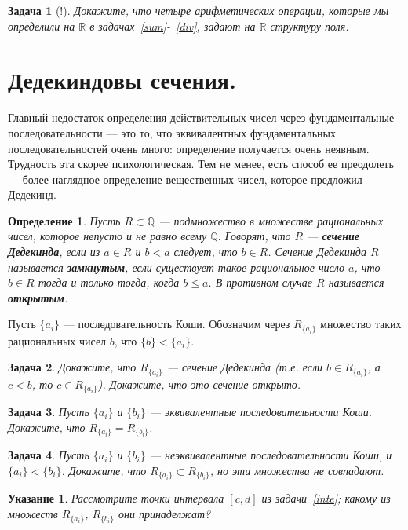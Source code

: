 \documentclass[12pt]{book}
\newcommand{\subs}{\section}
\def\R{{\mathbb R}}
\def\Q{{\mathbb Q}}
\theoremstyle{upshape}
\newtheorem{zadacha}{Задача}[chapter]
\theoremstyle{generic}
\newtheorem{opredelenie}[teorema]{Определение}
\theoremstyle{upshapenonumber}
\newtheorem{ukazanie}{Указание}[section]
\newcommand{\следствие}{%
     \refstepcounter{teorema}
     {\noindent\bf Следствие \thechapter.\arabic{teorema}:\ }}
\newcommand{\пример}{%
     \refstepcounter{teorema}
     {\noindent\bf Пример \thechapter.\arabic{teorema}:\ }}
\newcommand{\лемма}{%
     \refstepcounter{teorema}
     {\noindent\bf Лемма \thechapter.\arabic{teorema}:\ }}
\newcommand{\теорема}{%
     \refstepcounter{teorema}
     {\noindent\bf Теорема \thechapter.\arabic{teorema}:\ }}
\newcommand{\утверждение}{%
     \refstepcounter{teorema}
     {\noindent\bf Утверждение \thechapter.\arabic{teorema}:\ }}
\begin{document}
\begin{zadacha}[!] Докажите, что четыре арифметических операции,
которые мы определили на $\R$ в задачах~\ref{sum}-~\ref{div}, задают
на $\R$ структуру поля.
\end{zadacha}

\subs{Дедекиндовы сечения.}

Главный недостаток определения действительных чисел через
фундаментальные последовательности --- это то, что эквивалентных
фундаментальных последовательностей очень много: определение
получается очень неявным. Трудность эта скорее психологическая. Тем
не менее, есть способ ее преодолеть --- более наглядное определение
вещественных чисел, которое предложил Дедекинд.

\begin{opredelenie}
Пусть $R \subset \Q$ --- подмножество в множестве рациональных чисел,
которое непусто и не равно всему $\Q$. Говорят, что $R$ --- {\bf
сечение Дедекинда}, если из $a \in R$ и $b < a$ следует, что $b \in
R$. Сечение Дедекинда $R$ называется {\bf замкнутым}, если существует
такое рациональное число $a$, что $b \in R$ тогда и только тогда,
когда $b \leq a$. В противном случае $R$ называется {\bf открытым}.
\end{opredelenie}

Пусть $\{a_i\}$ --- последовательность Коши. Обозначим через
$R_{\{a_i\}}$ множество таких рациональных чисел $b$, что $\{b\} <
\{a_i\}$.

\begin{zadacha}
Докажите, что $R_{\{a_i\}}$ --- сечение Дедекинда (т.е. если $b
\in R_{\{a_i\}}$, а $c < b$, то $c \in R_{\{a_i\}}$). Докажите, что
это сечение открыто.
\end{zadacha}

\begin{zadacha} Пусть $\{ a_i\}$ и $\{b_i\}$ --- эквивалентные
последовательности Коши. Докажите, что $R_{\{a_i\}} = R_{\{b_i\}}$.
\end{zadacha}

\begin{zadacha}
Пусть $\{ a_i\}$ и $\{b_i\}$ --- неэквивалентные последовательности
Коши, и $\{a_i\} < \{b_i\}$. Докажите, что $R_{\{a_i\}} \subset
R_{\{b_i\}}$, но эти множества не совпадают.
\end{zadacha}

\begin{ukazanie}
Рассмотрите точки интервала $[c,d]$ из задачи~\ref{inte}; какому из
множеств $R_{\{a_i\}}$, $R_{\{b_i\}}$ они принаделжат?
\end{ukazanie}
 
\end{document}
